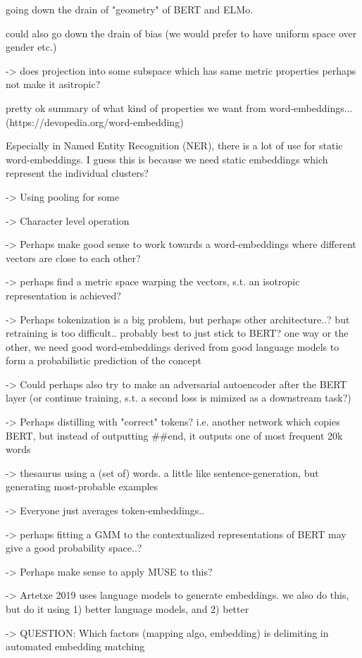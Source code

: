 \documentclass[a4paper,12pt,twoside,openright]{report}
\begin{document}
going down the drain of "geometry" of BERT and ELMo.

could also go down the drain of bias (we would prefer to have uniform space over gender etc.)

-> does projection into some subspace which has same metric properties perhaps not make it asitropic?

pretty ok summary of what kind of properties we want from word-embeddings... (https://devopedia.org/word-embedding)


Especially in Named Entity Recognition (NER), there is a lot of use for static word-embeddings.
I guess this is because we need static embeddings which represent the individual clusters?

-> Using pooling for some 

-> Character level operation

-> Perhaps make good sense to work towards a word-embeddings where different vectors are close to each other?

-> perhaps find a metric space warping the vectors, s.t. an isotropic representation is achieved?

-> Perhaps tokenization is a big problem, but perhaps other architecture..? but retraining is too difficult.. probably best to just stick to BERT? one way or the other, we need good word-embeddings derived from good language models to form a probabilistic prediction of the concept


-> Could perhaps also try to make an adversarial autoencoder after the BERT layer (or continue training, s.t. a second loss is mimized as a downstream task?)

-> Perhaps distilling with "correct" tokens? i.e. another network which copies BERT, but instead of outputting \#\#end, it outputs one of most frequent 20k words

-> thesaurus using a (set of) words. a little like sentence-generation, but generating most-probable examples

-> Everyone just averages token-embeddings..

-> perhaps fitting a GMM to the contextualized representations of BERT may give a good probability space..?

-> Perhaps make sense to apply MUSE to this?

-> Artetxe 2019 uses language models to generate embeddings. we also do this, but do it using 1) better language models, and 2) better 

-> QUESTION: Which factors (mapping algo, embedding) is delimiting in automated embedding matching
\end{document}
